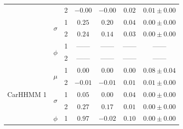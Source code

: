 \begin{table}
{\begin{tabular}{ccccccc}
                           &                               & 2                             & $-0.00$                         & $-0.00$                     & $0.02$                             & $0.01 \pm 0.00$                             \\
                           & \multirow{2}{*}{$\sigma$}     & 1                             & $0.25$                         & $0.20$                     & $0.04$                             & $0.00 \pm 0.00$                             \\
                           &                               & 2                             & $0.24$                         & $0.14$                     & $0.03$                             & $0.00 \pm 0.00$                             \\ 
                           & \multirow{2}{*}{$\phi$}       & 1                             & ------                         & ------                     & ------                             & ------                                      \\
                           &                               & 2                             & ------                         & ------                     & ------                             & ------                                      \\ \hline
\multirow{6}{*}{CarHHMM 1} & \multirow{2}{*}{$\mu$}        & 1                             & $0.00$                         & $0.00$                     & $0.00$                             & $0.08 \pm 0.04$                             \\
                           &                               & 2                             & $-0.01$                         & $-0.01$                     & $0.01$                             & $0.01 \pm 0.00$                             \\
                           & \multirow{2}{*}{$\sigma$}     & 1                             & $0.05$                         & $0.00$                     & $0.04$                             & $0.00 \pm 0.00$                             \\
                           &                               & 2                             & $0.27$                         & $0.17$                     & $0.01$                             & $0.00 \pm 0.00$                             \\ 
                           & \multirow{2}{*}{$\phi$}       & 1                             & $0.97$                         & $-0.02$                     & $0.10$                             & $0.00 \pm 0.00$                             \\

\end{tabular}}
\end{table}
